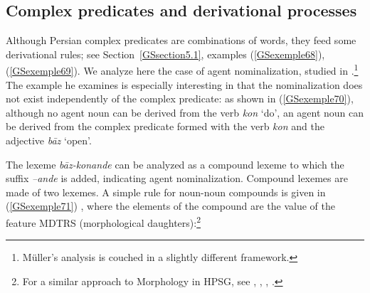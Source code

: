 \documentclass[output=paper
                ,modfonts
                ,nonflat
	        ,collection
	        ,collectionchapter
	        ,collectiontoclongg
 	        ,biblatex
                ,babelshorthands
                ,newtxmath
                ,draftmode
                ,colorlinks, citecolor=brown
]{./langsci/langscibook}
\begin{document}
{\subsection{Complex predicates and derivational processes}\label{GSsection5.2}

Although Persian complex predicates are combinations of words, they feed some derivational rules; see Section~\ref{GSsection5.1}, examples (\ref{GSexemple68}), (\ref{GSexemple69}). We analyze here the case of agent nominalization, studied in \cite{muller2010persian}.\footnote{Müller’s analysis is couched in a slightly different framework.} The example he examines is especially interesting in that the nominalization does not exist independently of the complex predicate: as shown in (\ref{GSexemple70}), although no agent noun can be derived from the verb \textit{kon} `do', an agent noun can be derived from the complex predicate formed with the verb \textit{kon} and the adjective \textit{b\=az} `open'.


\begin{exe}
\end{exe}

The lexeme \textit{b\=az-konande} can be analyzed as a compound lexeme to which the suffix \textit{–ande} is added, indicating agent nominalization. Compound lexemes are made of two lexemes. A simple rule for noun-noun compounds is given in (\ref{GSexemple71}) \citep{bonami2018lexeme}, where the elements of the compound are the value of the feature MDTRS (morphological daughters):\footnote{For a similar approach to Morphology in HPSG, see \cite{orgun1996sign}, \cite{riehemann1998type}, \cite{koenig1999lexical}, \cite{sag2003syntactic}.}

\begin{exe}
\end{exe}

}
\end{document}
